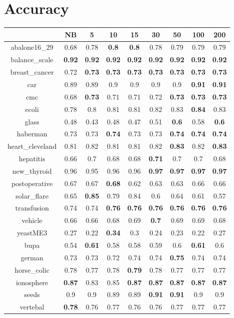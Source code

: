 \documentclass{article}%
\begin{document}
%
\normalsize%
\section*{Accuracy}%
\begin{tabular}{c|cccccccc}%
\hline%
&NB&5&10&15&30&50&100&200\\%
\hline%
abalone16\_29&0.68&0.78&\textbf{0.8}&\textbf{0.8}&0.78&0.79&0.79&0.79\\%
\hline%
balance\_scale&\textbf{0.92}&\textbf{0.92}&\textbf{0.92}&\textbf{0.92}&\textbf{0.92}&\textbf{0.92}&\textbf{0.92}&\textbf{0.92}\\%
\hline%
breast\_cancer&0.72&\textbf{0.73}&\textbf{0.73}&\textbf{0.73}&\textbf{0.73}&\textbf{0.73}&\textbf{0.73}&\textbf{0.73}\\%
\hline%
car&0.89&0.89&0.9&0.9&0.9&0.9&\textbf{0.91}&\textbf{0.91}\\%
\hline%
cmc&0.68&\textbf{0.73}&0.71&0.71&0.72&\textbf{0.73}&\textbf{0.73}&\textbf{0.73}\\%
\hline%
ecoli&0.78&0.8&0.81&0.81&0.82&0.83&\textbf{0.84}&0.83\\%
\hline%
glass&0.48&0.43&0.48&0.47&0.51&\textbf{0.6}&0.58&\textbf{0.6}\\%
\hline%
haberman&0.73&0.73&\textbf{0.74}&0.73&0.73&\textbf{0.74}&\textbf{0.74}&\textbf{0.74}\\%
\hline%
heart\_cleveland&0.81&0.82&0.81&0.81&0.82&\textbf{0.83}&0.82&\textbf{0.83}\\%
\hline%
hepatitis&0.66&0.7&0.68&0.68&\textbf{0.71}&0.7&0.7&0.68\\%
\hline%
new\_thyroid&0.96&0.95&0.96&0.96&\textbf{0.97}&\textbf{0.97}&\textbf{0.97}&\textbf{0.97}\\%
\hline%
postoperative&0.67&0.67&\textbf{0.68}&0.62&0.63&0.63&0.66&0.66\\%
\hline%
solar\_flare&0.65&\textbf{0.85}&0.79&0.84&0.6&0.64&0.61&0.57\\%
\hline%
transfusion&0.74&0.74&\textbf{0.76}&\textbf{0.76}&\textbf{0.76}&\textbf{0.76}&\textbf{0.76}&\textbf{0.76}\\%
\hline%
vehicle&0.66&0.66&0.68&0.69&\textbf{0.7}&0.69&0.69&0.68\\%
\hline%
yeastME3&0.27&0.22&\textbf{0.34}&0.3&0.24&0.23&0.22&0.27\\%
\hline%
bupa&0.54&\textbf{0.61}&0.58&0.58&0.59&0.6&\textbf{0.61}&0.6\\%
\hline%
german&0.73&0.73&0.72&0.74&0.74&\textbf{0.75}&0.74&0.74\\%
\hline%
horse\_colic&0.78&0.77&0.78&\textbf{0.79}&0.78&0.77&0.77&0.77\\%
\hline%
ionosphere&\textbf{0.87}&0.83&0.85&\textbf{0.87}&\textbf{0.87}&\textbf{0.87}&\textbf{0.87}&\textbf{0.87}\\%
\hline%
seeds&0.9&0.9&0.89&0.89&\textbf{0.91}&\textbf{0.91}&0.9&0.9\\%
\hline%
vertebal&\textbf{0.78}&0.76&0.77&0.76&0.76&0.77&0.77&0.77\\%
\hline%
\end{tabular}
\end{document}
